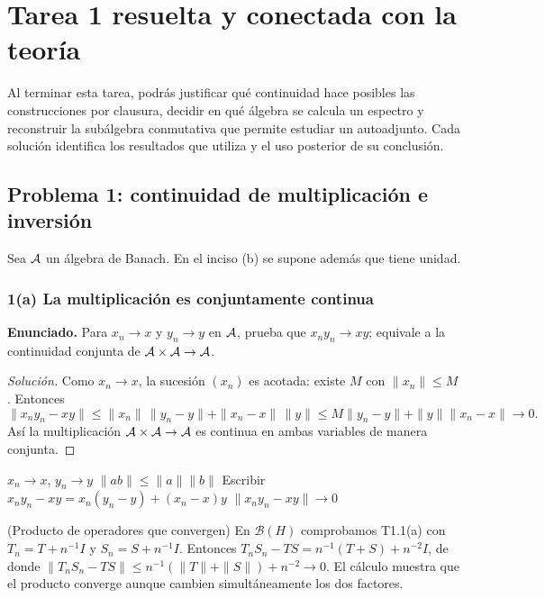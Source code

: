 \chapter{Tarea 1 resuelta y conectada con la teoría}

\begin{context}
Al terminar esta tarea, podrás justificar qué continuidad hace posibles las construcciones por
clausura, decidir en qué álgebra se calcula un espectro y reconstruir la subálgebra conmutativa que
permite estudiar un autoadjunto. Cada solución identifica los resultados que utiliza y el uso
posterior de su conclusión.
\end{context}

\section{Problema 1: continuidad de multiplicación e inversión}

Sea $\mathcal A$ un álgebra de Banach. En el inciso (b) se supone además que tiene unidad.

\subsection*{1(a) La multiplicación es conjuntamente continua}

\noindent\textbf{Enunciado.} Para $x_n\to x$ y $y_n\to y$ en $\mathcal A$, prueba que $x_ny_n\to xy$; equivale a la continuidad conjunta de $\mathcal A\times\mathcal A\to\mathcal A$.

\begin{proof}[Solución]
Como $x_n\to x$, la sucesión $(x_n)$ es acotada: existe $M$ con $\|x_n\|\le M$. Entonces
\[
\|x_ny_n-xy\|
\le \|x_n\|\,\|y_n-y\|+\|x_n-x\|\,\|y\|
\le M\|y_n-y\|+\|y\|\|x_n-x\|\to0.
\]
Así la multiplicación $\mathcal A\times\mathcal A\to\mathcal A$ es continua en ambas variables de manera conjunta.
\end{proof}

\proofdiagram
{$x_n\to x$, $y_n\to y$}
{$\|ab\|\le\|a\|\|b\|$}
{Escribir $x_ny_n-xy=x_n(y_n-y)+(x_n-x)y$}
{$\|x_ny_n-xy\|\to0$}

\begin{cthejemplo}{(Producto de operadores que convergen)}
En $\mathcal B(H)$ comprobamos T1.1(a) con $T_n=T+n^{-1}I$ y $S_n=S+n^{-1}I$.
Entonces $T_nS_n-TS=n^{-1}(T+S)+n^{-2}I$, de donde
$\|T_nS_n-TS\|\le n^{-1}(\|T\|+\|S\|)+n^{-2}\to0$.
El cálculo muestra que el producto converge aunque cambien simultáneamente los dos factores.
\end{cthejemplo}

